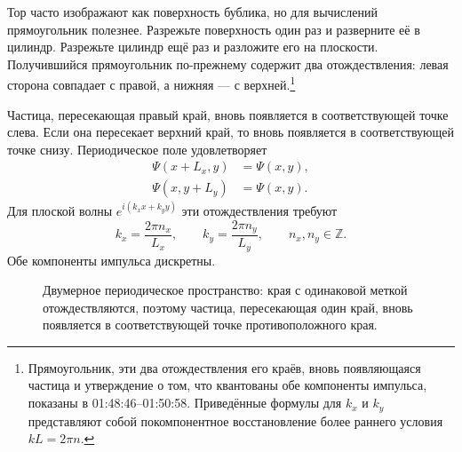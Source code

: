Тор часто изображают как поверхность бублика, но для вычислений прямоугольник полезнее. Разрежьте поверхность один раз и разверните её в цилиндр. Разрежьте цилиндр ещё раз и разложите его на плоскости. Получившийся прямоугольник по-прежнему содержит два отождествления: левая сторона совпадает с правой, а нижняя — с верхней.\footnote{Прямоугольник, эти два отождествления его краёв, вновь появляющаяся частица и утверждение о том, что квантованы обе компоненты импульса, показаны в 01:48:46--01:50:58. Приведённые формулы для \(k_x\) и \(k_y\) представляют собой покомпонентное восстановление более раннего условия \(kL=2\pi n\).}

Частица, пересекающая правый край, вновь появляется в соответствующей точке слева. Если она пересекает верхний край, то вновь появляется в соответствующей точке снизу. Периодическое поле удовлетворяет
\begin{align}
\Psi(x+L_x,y)&=\Psi(x,y),\\
\Psi(x,y+L_y)&=\Psi(x,y).
\end{align}
Для плоской волны \(e^{i(k_x x+k_y y)}\) эти отождествления требуют
\begin{equation}
k_x=\frac{2\pi n_x}{L_x},
\qquad
k_y=\frac{2\pi n_y}{L_y},
\qquad
n_x,n_y\in\mathbb Z.
\end{equation}
Обе компоненты импульса дискретны.

\begin{figure}[t]
\centering
{}
\caption{Двумерное периодическое пространство: края с одинаковой меткой отождествляются, поэтому частица, пересекающая один край, вновь появляется в соответствующей точке противоположного края.}
\end{figure}

\begin{classroomqa}
\end{classroomqa}

